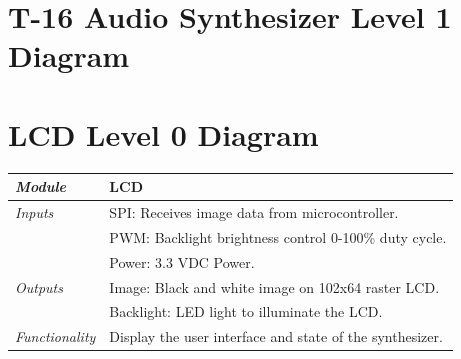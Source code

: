\documentclass{article}
\begin{document}
\section{T-16 Audio Synthesizer Level 1 Diagram}

\newpage

\section{LCD Level 0 Diagram}

\begin{tabular}{|p{1in}|p{5in}|}
\hline
\emph{Module} & LCD \\
\hline
\emph{Inputs}& SPI: Receives image data from microcontroller.\\
	     & PWM: Backlight brightness control 0-100\% duty cycle.\\
	     & Power: 3.3 VDC Power.\\
\hline
\emph{Outputs}& Image: Black and white image on 102x64 raster LCD.\\
	      & Backlight: LED light to illuminate the LCD.\\ 
\hline
\emph{Functionality}& Display the user interface and state of the synthesizer.\\
\hline
\end{tabular}
\end{document}
